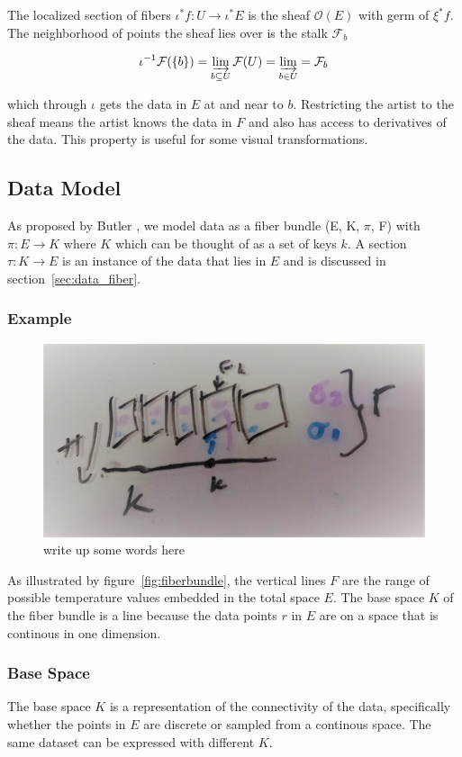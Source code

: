 \documentclass[../main.tex]{subfiles}
\begin{document}
The localized section of fibers $\iota^*f: U \rightarrow \iota^*E$ is the sheaf $\mathcal{O}(E)$ with germ of $\xi^*f$. The neighborhood of points the sheaf lies over is the stalk $\mathcal{F}_b$ \cite{StalkSheaf2019,spanier1989algebraic}

\begin{equation}
    \label{eq:stalk}
    \iota^{-1}\mathcal{F}(\{b\}) = \varinjlim_{b\subseteq U}\mathcal{F}(U) =  \varinjlim_{b \in U} = \mathcal{F}_b 
\end{equation}

which through $\iota$ gets the data in $E$ at and near to $b$. Restricting the artist to the sheaf means the artist knows the data in $F$ and also has access to derivatives of the data. This property is useful for some visual transformations. 

\subsection{Data Model}
As proposed by Butler \cite{butlerVectorBundleClassesForm1992,butlerVisualizationModelBased1989}, we model data as a fiber bundle (E, K, $\pi$, F) with $\pi: E \rightarrow K$ where $K$ which can be thought of as a set of keys $k$. A section $\tau:K \rightarrow E$ is an instance of the data that lies in $E$ and is discussed in section~\ref{sec:data_fiber}. 

\subsubsection{Example}

\begin{figure}[H]
    \label{fig:data_fiber_bundle}
    \includegraphics[width=.2\linewidth]{figures/sections/math/fiberbundle.png}
    \caption{write up some words here}
\end{figure}

As illustrated by figure~\ref{fig:fiberbundle}, the vertical lines $F$ are the range of possible temperature values embedded in the total space $E$. The base space $K$ of the fiber bundle is a line because the data points $r$ in $E$ are on a space that is  continous in one dimension. 

\subsubsection{Base Space}
The base space $K$ is a representation of the connectivity of the data, specifically whether the points in $E$ are discrete or sampled from a continous space. The same dataset can be expressed with different $K$. 
\end{document}
